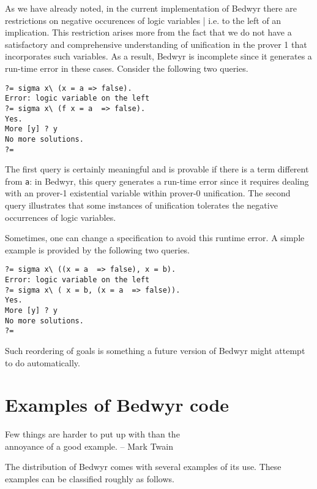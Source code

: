 \documentclass{article}
\begin{document}
As we have already noted, in the current implementation of Bedwyr
there are restrictions on negative occurences of logic variables |
i.e. to the left of an implication.
This restriction arises more from the fact that we do not
have a satisfactory and comprehensive understanding of unification in
the prover 1 that incorporates such variables.  As a result, Bedwyr
is incomplete since it generates a run-time error in these cases.
Consider the following two queries.
\begin{verbatim}
?= sigma x\ (x = a => false).
Error: logic variable on the left
?= sigma x\ (f x = a  => false).
Yes.
More [y] ? y
No more solutions.
?=
\end{verbatim}
The first query is certainly meaningful and is provable if there is a
term different from {\tt a}: in Bedwyr, this query generates a
run-time error since it requires dealing with an prover-1
existential variable within prover-0 unification. The second query illustrates
that some instances of unification tolerates the negative 
occurrences of logic variables.

Sometimes, one can change a specification to avoid this runtime
error.  A simple example is provided by the following two queries.
\begin{verbatim}
?= sigma x\ ((x = a  => false), x = b).
Error: logic variable on the left
?= sigma x\ ( x = b, (x = a  => false)).
Yes.
More [y] ? y
No more solutions.
?= 
\end{verbatim}
Such reordering of goals is something a future version of Bedwyr might
attempt to do automatically.

\section{Examples of Bedwyr code}

\begin{flushright}
Few things are harder to put up with than the\\
annoyance of a good example.   -- Mark Twain
\end{flushright}

The distribution of Bedwyr comes with several examples of its use.
These examples can be classified roughly as follows.
\end{document}
